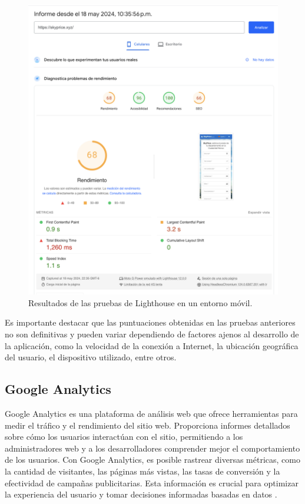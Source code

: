 \begin{figure}[H]
    \centering
    \includegraphics[width=1.0\textwidth]{imagenes/05-implementacion/pruebas/lighthouse-mobile.png}
    \caption{Resultados de las pruebas de Lighthouse en un entorno móvil.}
    \label{fig:lighthouse-mobile}
\end{figure}

Es importante destacar que las puntuaciones obtenidas en las pruebas anteriores
no son definitivas y pueden variar dependiendo de factores ajenos al desarrollo
de la aplicación, como la velocidad de la conexión a Internet, la ubicación geográfica
del usuario, el dispositivo utilizado, entre otros.

\subsection{Google Analytics}
Google Analytics es una plataforma de análisis web que ofrece herramientas para
medir el tráfico y el rendimiento del sitio web. Proporciona informes detallados
sobre cómo los usuarios interactúan con el sitio, permitiendo a los administradores
web y a los desarrolladores comprender mejor el comportamiento de los usuarios.
Con Google Analytics, es posible rastrear diversas métricas, como la cantidad de
visitantes, las páginas más vistas, las tasas de conversión y la efectividad de
campañas publicitarias. Esta información es crucial para optimizar la experiencia
del usuario y tomar decisiones informadas basadas en datos \cite{google_analytics_learn}.

